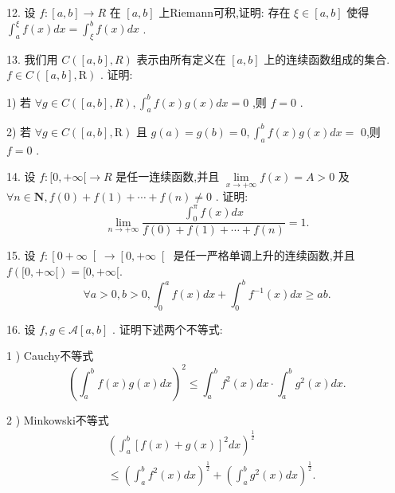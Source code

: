 12. 设 $f : \left\lbrack  {a,b}\right\rbrack   \rightarrow  R$ 在 $\left\lbrack  {a,b}\right\rbrack$ 上Riemann可积,证明: 存在 $\xi  \in  \left\lbrack  {a,b}\right\rbrack$ 使得 ${\int }_{a}^{\xi }f\left( x\right) {dx} = {\int }_{\xi }^{b}f\left( x\right) {dx}$ .

13. 我们用 $C\left( {\left\lbrack  {a,b}\right\rbrack  ,R}\right)$ 表示由所有定义在 $\left\lbrack  {a,b}\right\rbrack$ 上的连续函数组成的集合. $f \in  C\left( {\left\lbrack  {a,b}\right\rbrack  ,\mathrm{R}}\right)$ . 证明:

1) 若 $\forall g \in  C\left( {\left\lbrack  {a,b}\right\rbrack  ,R}\right) ,{\int }_{a}^{b}f\left( x\right) g\left( x\right) {dx} = 0$ ,则 $f = 0$ .

2) 若 $\forall g \in  C\left( {\left\lbrack  {a,b}\right\rbrack  ,\mathrm{R}}\right)$ 且 $g\left( a\right)  = g\left( b\right)  = 0,{\int }_{a}^{b}f\left( x\right) g\left( x\right) {dx} =$ 0,则 $f = 0$ .

14. 设 $f : \lbrack 0, + \infty \lbrack  \rightarrow  R$ 是任一连续函数,并且 $\mathop{\lim }\limits_{{x \rightarrow   + \infty }}f\left( x\right)  = A > 0$ 及 $\forall n \in  \mathbf{N},f\left( 0\right)  + f\left( 1\right)  + \cdots  + f\left( n\right)  \neq  0$ . 证明:
$$\mathop{\lim }\limits_{{n \rightarrow   + \infty }}\frac{{\int }_{0}^{\pi }f\left( x\right) {dx}}{f\left( 0\right)  + f\left( 1\right)  + \cdots  + f\left( n\right) } = 1.$$

15. 设 $f : \left\lbrack  {0 + \infty }\right\lbrack   \rightarrow  \left\lbrack  {0, + \infty }\right\lbrack$ 是任一严格单调上升的连续函数,并且 $f\left( {\lbrack 0, + \infty \lbrack }\right)  = \lbrack 0, + \infty \lbrack .$
$$\forall a > 0,b > 0,{\int }_{0}^{a}f\left( x\right) {dx} + {\int }_{0}^{b}{f}^{-1}\left( x\right) {dx} \geq  {ab}.$$

16. 设 $f,g \in  \mathcal{A}\left\lbrack  {a,b}\right\rbrack$ . 证明下述两个不等式:

1 ) Cauchy不等式
$${\left( {\int }_{a}^{b}f\left( x\right) g\left( x\right) dx\right) }^{2} \leq  {\int }_{a}^{b}{f}^{2}\left( x\right) {dx} \cdot  {\int }_{a}^{b}{g}^{2}\left( x\right) {dx}.$$

2 ) Minkowski不等式
\begin{align*}
	&{\left( {\int }_{a}^{b}{\left\lbrack  f\left( x\right)  + g\left( x\right) \right\rbrack  }^{2}dx\right) }^{\frac{1}{2}}\\
	&\leq  {\left( {\int }_{a}^{b}{f}^{2}\left( x\right) dx\right) }^{\frac{1}{2}} + {\left( {\int }_{a}^{b}{g}^{2}\left( x\right) dx\right) }^{\frac{1}{2}}.
\end{align*}

